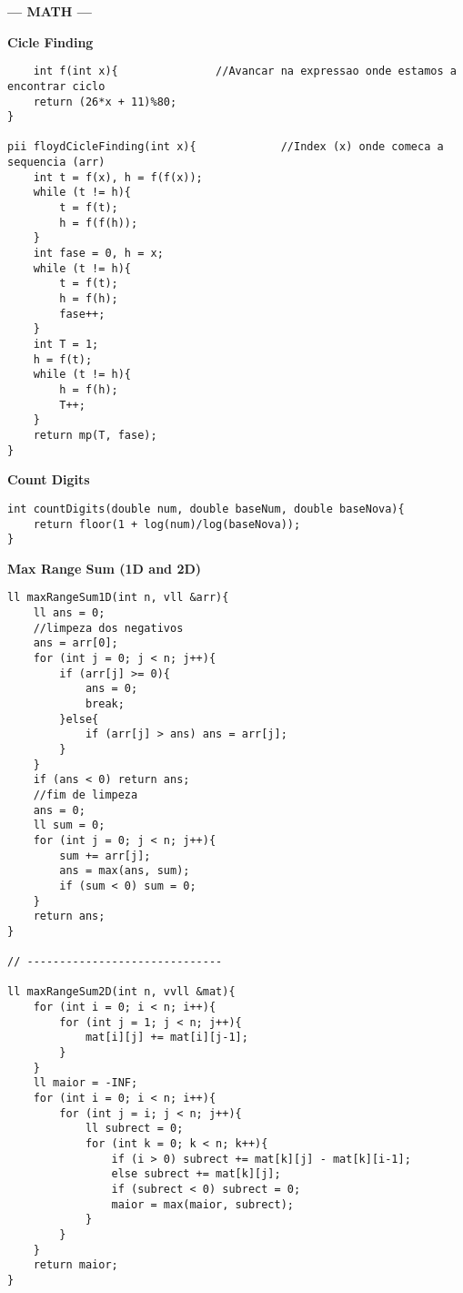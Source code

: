 \documentclass{article}
\begin{document}
\begin{multicols}{2}
\begin{lstlisting}
\end{lstlisting}


\large
\begin{center}
\huge\textbf{--- MATH ---}
\end{center}
\large

\large
\huge\textbf{Cicle Finding}
\large
\begin{lstlisting}
	int f(int x){               //Avancar na expressao onde estamos a encontrar ciclo
	return (26*x + 11)%80;
}

pii floydCicleFinding(int x){             //Index (x) onde comeca a sequencia (arr)
	int t = f(x), h = f(f(x));
	while (t != h){
		t = f(t);
		h = f(f(h));
	}
	int fase = 0, h = x;
	while (t != h){
		t = f(t);
		h = f(h);
		fase++;
	}
	int T = 1;
	h = f(t);
	while (t != h){
		h = f(h);
		T++;
	}
	return mp(T, fase);
}
\end{lstlisting}

\large
\huge\textbf{Count Digits}
\large
\begin{lstlisting}
int countDigits(double num, double baseNum, double baseNova){
	return floor(1 + log(num)/log(baseNova));
}	
\end{lstlisting}

\large
\huge\textbf{Max Range Sum (1D and 2D)}
\large
\begin{lstlisting}
ll maxRangeSum1D(int n, vll &arr){
	ll ans = 0;
	//limpeza dos negativos
	ans = arr[0];
	for (int j = 0; j < n; j++){
		if (arr[j] >= 0){
			ans = 0;
			break;
		}else{
			if (arr[j] > ans) ans = arr[j];
		}
	}
	if (ans < 0) return ans;
	//fim de limpeza
	ans = 0;
	ll sum = 0;
	for (int j = 0; j < n; j++){
		sum += arr[j];
		ans = max(ans, sum);
		if (sum < 0) sum = 0;
	}
	return ans;
}

// ------------------------------

ll maxRangeSum2D(int n, vvll &mat){
	for (int i = 0; i < n; i++){
		for (int j = 1; j < n; j++){
			mat[i][j] += mat[i][j-1];
		}
	}
	ll maior = -INF;
	for (int i = 0; i < n; i++){
		for (int j = i; j < n; j++){
			ll subrect = 0;
			for (int k = 0; k < n; k++){
				if (i > 0) subrect += mat[k][j] - mat[k][i-1];
				else subrect += mat[k][j];
				if (subrect < 0) subrect = 0;
				maior = max(maior, subrect);
			}
		}
	}
	return maior;
}
\end{lstlisting}


\end{multicols}
\end{document}
